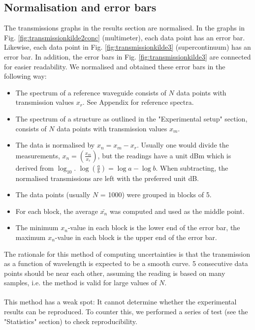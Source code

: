\subsection{Normalisation and error bars} \label{sec:errorbars}
The transmissions graphs in the results section are normalised. In the graphs in Fig. \ref{fig:transmissionkilde2conc} (multimeter), each data point has an error bar. Likewise, each data point in Fig. \ref{fig:transmissionkilde3} (supercontinuum) has an error bar. In addition, the error bars in Fig. \ref{fig:transmissionkilde3} are connected for easier readability. We normalised and obtained these error bars in the following way:

\begin{itemize}
    \item The spectrum of a reference waveguide consists of $N$ data points with transmission values $x_{r}$. See Appendix for reference spectra.
    \item The spectrum of a structure as outlined in the "Experimental setup" section, consists of $N$ data points with transmission values $x_{m}$.
    \item The data is normalised by $x_n = x_{m} - x_{r}$. Usually one would divide the measurements, $ x_n = \left( \frac{x_{m}}{x_{r}} \right)$, but the readings have a unit dBm which is derived from $\log_{10}$. $\log \left({\frac{a}{b}} \right) = \log{a} - \log{b}$. When subtracting, the normalised transmissions are left with the preferred unit dB.
    \item The data points (usually $N$ = 1000) were grouped in blocks of 5. 
    \item For each block, the average $\bar{x_n}$ was computed and used as the middle point.
    \item The minimum $x_n$-value in each block is the lower end of the error bar, the maximum $x_n$-value in each block is the upper end of the error bar.
\end{itemize}

The rationale for this method of computing uncertainties is that the transmission as a function of wavelength is expected to be a smooth curve. 5 consecutive data points should be near each other, assuming the reading is based on many samples, i.e. the method is valid for large values of $N$.\\
\\
This method has a weak spot: It cannot determine whether the experimental results can be reproduced. To counter this, we performed a series of test (see the "Statistics" section) to check reproducibility.

